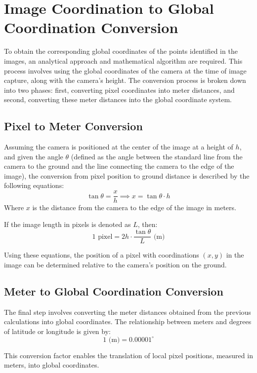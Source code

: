 \documentclass[conference]{IEEEtran}
\begin{document}
\section{Image Coordination to Global Coordination Conversion}\label{Image Coordination to Global Coordination Conversion}
To obtain the corresponding global coordinates of the points identified in the images, an analytical approach and mathematical algorithm are required. This process involves using the global coordinates of the camera at the time of image capture, along with the camera's height. The conversion process is broken down into two phases: first, converting pixel coordinates into meter distances, and second, converting these meter distances into the global coordinate system.

\subsection{Pixel to Meter Conversion}\label{Pixel to Meter Conversion}
Assuming the camera is positioned at the center of the image at a height of \( h \), and given the angle \( \theta \) (defined as the angle between the standard line from the camera to the ground and the line connecting the camera to the edge of the image), the conversion from pixel position to ground distance is described by the following equations:
\[
\tan \theta = \frac{x}{h} \implies x = \tan \theta  \cdot h
\]
Where \( x \) is the distance from the camera to the edge of the image in meters.

If the image length in pixels is denoted as \( L \), then:
\[
1 \text{ pixel} = 2h \cdot \frac{\tan \theta}{L} \text{ (m)}
\]

Using these equations, the position of a pixel with coordinations \((x, y)\) in the image can be determined relative to the camera's position on the ground.

\subsection{Meter to Global Coordination Conversion}\label{Meter to Global Coordination Conversion}
The final step involves converting the meter distances obtained from the previous calculations into global coordinates. The relationship between meters and degrees of latitude or longitude is given by:
\[
1 \text{ (m)} = 0.00001^\circ
\]

This conversion factor enables the translation of local pixel positions, measured in meters, into global coordinates.
\end{document}
